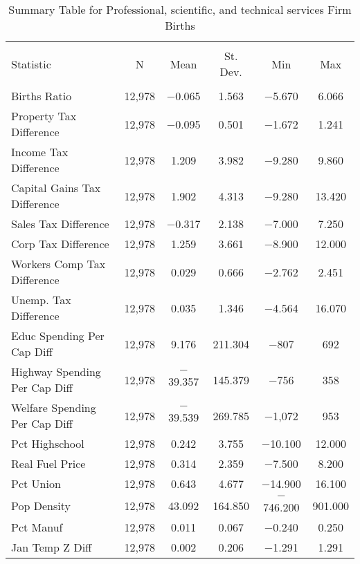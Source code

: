 
\begin{table}[!htbp] \centering 
  \caption{Summary Table for  Professional, scientific, and technical services Firm Births} 
  \label{54summary} 
\begin{tabular}{@{\extracolsep{5pt}}lccccc} 
\\[-1.8ex]\hline 
\hline \\[-1.8ex] 
Statistic & \multicolumn{1}{c}{N} & \multicolumn{1}{c}{Mean} & \multicolumn{1}{c}{St. Dev.} & \multicolumn{1}{c}{Min} & \multicolumn{1}{c}{Max} \\ 
\hline \\[-1.8ex] 
Births Ratio & 12,978 & $-$0.065 & 1.563 & $-$5.670 & 6.066 \\ 
Property Tax Difference & 12,978 & $-$0.095 & 0.501 & $-$1.672 & 1.241 \\ 
Income Tax Difference & 12,978 & 1.209 & 3.982 & $-$9.280 & 9.860 \\ 
Capital Gains Tax Difference & 12,978 & 1.902 & 4.313 & $-$9.280 & 13.420 \\ 
Sales Tax Difference & 12,978 & $-$0.317 & 2.138 & $-$7.000 & 7.250 \\ 
Corp Tax Difference & 12,978 & 1.259 & 3.661 & $-$8.900 & 12.000 \\ 
Workers Comp Tax Difference & 12,978 & 0.029 & 0.666 & $-$2.762 & 2.451 \\ 
Unemp. Tax Difference & 12,978 & 0.035 & 1.346 & $-$4.564 & 16.070 \\ 
Educ Spending Per Cap Diff & 12,978 & 9.176 & 211.304 & $-$807 & 692 \\ 
Highway Spending Per Cap Diff & 12,978 & $-$39.357 & 145.379 & $-$756 & 358 \\ 
Welfare Spending Per Cap Diff & 12,978 & $-$39.539 & 269.785 & $-$1,072 & 953 \\ 
Pct Highschool & 12,978 & 0.242 & 3.755 & $-$10.100 & 12.000 \\ 
Real Fuel Price & 12,978 & 0.314 & 2.359 & $-$7.500 & 8.200 \\ 
Pct Union & 12,978 & 0.643 & 4.677 & $-$14.900 & 16.100 \\ 
Pop Density & 12,978 & 43.092 & 164.850 & $-$746.200 & 901.000 \\ 
Pct Manuf & 12,978 & 0.011 & 0.067 & $-$0.240 & 0.250 \\ 
Jan Temp Z Diff & 12,978 & 0.002 & 0.206 & $-$1.291 & 1.291 \\ 

\end{tabular}
\end{table}

